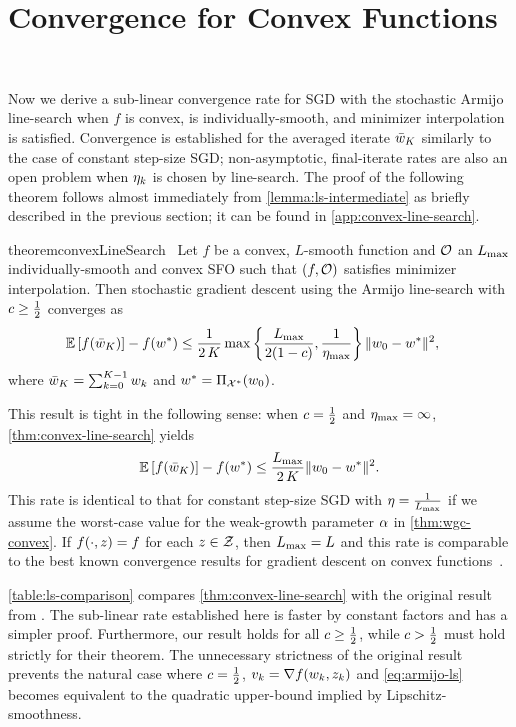 \section{Convergence for Convex Functions}~\label{sec:ls-convex}

Now we derive a sub-linear convergence rate for \ac{SGD} with the stochastic Armijo line-search when \( f \) is convex, \oracle{} is individually-smooth, and minimizer interpolation is satisfied.
Convergence is established for the averaged iterate \( \bar \w_K \) similarly to the case of constant step-size \ac{SGD};\@
non-asymptotic, final-iterate rates are also an open problem when \( \etak \) is chosen by line-search.
The proof of the following theorem follows almost immediately from \autoref{lemma:ls-intermediate} as briefly described in the previous section; it can be found in \autoref{app:convex-line-search}.

\begin{restatable}{theorem}{convexLineSearch}~\label{thm:convex-line-search}
    Let \( f \) be a convex, \( L \)-smooth function and \( \oracle{} \) an \( \Lmax \) individually-smooth and convex \ac{SFO} such that \( \rbr{f, \oracle{}} \) satisfies minimizer interpolation.
    Then stochastic gradient descent using the Armijo line-search with \( c \geq \half \) converges as 
    \begin{align*}
        \E\sbr{f(\bar \w_K)} - f(\wopt) &\leq \frac{1}{2 \, K} \max\cbr{\frac{\Lmax}{2(1-c)}, \frac{1}{\etamax}} \norm{\w_0 - \wopt}^2, 
    \end{align*} 
    where \( \bar \w_K = \sum_{k=0}^{K-1} \wk \) and \( \wopt = \Pi_{\calX^*}(\w_0) \).
\end{restatable}
This result is tight in the following sense: when \( c = \half \) and \( \etamax = \infty \), \autoref{thm:convex-line-search} yields 
\[  \E\sbr{f(\bar \w_K)} - f(\wopt) \leq \frac{\Lmax}{2 \, K} \norm{\w_0 - \wopt}^2. \]
This rate is identical to that for constant step-size \ac{SGD} with \( \eta = \frac{1}{\Lmax} \) if we assume the worst-case value for the weak-growth parameter \( \wgc \) in \autoref{thm:wgc-convex}.
If \( f(\cdot, \z) = f \) for each \( z \in \calZ \), then \( \Lmax = L \) and this rate is comparable to the best known convergence results for gradient descent on convex functions~\citep{bubeck2015convex}. 

\autoref{table:ls-comparison} compares \autoref{thm:convex-line-search} with the original result from  \citet[Theorem 2]{vaswani2019painless}.
The sub-linear rate established here is faster by constant factors and has a simpler proof.
Furthermore, our result holds for all \( c \geq \half \), while \( c > \half \) must hold strictly for their theorem. 
The unnecessary strictness of the original result prevents the natural case where \( c = \half \),  \( v_k = \grad(\wk, \zk) \) and \autoref{eq:armijo-ls} becomes equivalent to the quadratic upper-bound implied by Lipschitz-smoothness.\\

